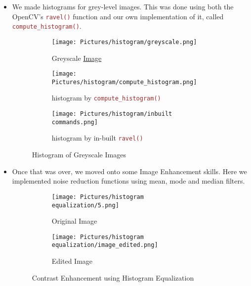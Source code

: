 \documentclass[a4paper]{article}
\begin{document}
\begin{itemize}
    \item We made histograms for grey-level images. This was done using both the OpenCV's \textcolor{brown}{\texttt{ravel()}} function and our own implementation of it, called \textcolor{brown}{\texttt{compute\_histogram()}}.
    \begin{figure}[h!]
        \centering
        \begin{subfigure}[b]{\linewidth}
            \centering
            \texttt{[image: Pictures/histogram/greyscale.png]}
            \caption{Greyscale \href{https://www.publicdomainpictures.net/en/view-image.php?image=5675&amp;picture=flowers-6}{Image}}
        \end{subfigure}
        \begin{subfigure}[b]{0.4\linewidth}
            \centering
            \texttt{[image: Pictures/histogram/compute\_histogram.png]}
            \caption{histogram by \textcolor{brown}{\texttt{compute\_histogram()}}}
        \end{subfigure}
        \begin{subfigure}[b]{0.4\linewidth}
            \centering
            \texttt{[image: Pictures/histogram/inbuilt commands.png]}
            \caption{histogram by in-built \textcolor{brown}{\texttt{ravel()}}}
        \end{subfigure}
        \caption{Histogram of Greyscale Images}
        \label{greyscaleHist}
    \end{figure}

    \item Once that was over, we moved onto some Image Enhancement skills. Here we implemented noise reduction functions using mean, mode and median filters.
    \begin{figure}[h!]
        \centering
        \begin{subfigure}[b]{0.3\linewidth}
            \texttt{[image: Pictures/histogram equalization/5.png]}
            \caption{Original Image}
        \end{subfigure}
        \begin{subfigure}[b]{0.3\linewidth}
            \texttt{[image: Pictures/histogram equalization/image\_edited.png]}
            \caption{Edited Image}
        \end{subfigure}
        \caption{Contrast Enhancement using Histogram Equalization}
        \label{fig:Histogram Equalization}
    \end{figure}


\end{itemize}
\end{document}
